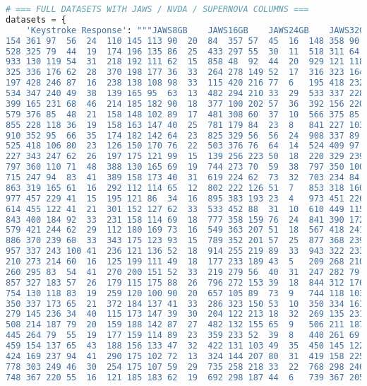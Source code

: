\begin{lstlisting}[language=Python]
# === FULL DATASETS WITH JAWS / NVDA / SUPERNOVA COLUMNS ===
datasets = {
    'Keystroke Response': """JAWS8GB	JAWS16GB	JAWS24GB	JAWS32GB	JAWS64GB	NVDA8GB	NVDA16GB	NVDA24GB	NVDA32GB	NVDA64GB	SUPERNOVA8GB	SUPERNOVA16GB	SUPERNOVA24GB	SUPERNOVA32GB	SUPERNOVA64GB	NARRATOR8GB	NARRATOR16GB	NARRATOR24GB	NARRATOR32GB	NARRATOR64GB
154	361	97	56	24	110	145	113	90	20	84	357	57	45	16	148	358	90	54	23
528	325	79	44	19	174	196	135	86	25	433	297	55	30	11	518	311	64	37	18
933	130	119	54	31	218	192	111	62	15	858	48	92	44	20	929	121	118	48	25
325	336	176	62	28	370	198	177	36	33	264	278	149	52	17	316	323	164	54	20
197	428	246	87	16	238	138	108	98	33	115	420	216	77	6	195	418	232	75	6
534	347	240	49	38	139	165	95	63	13	482	294	210	33	29	533	337	228	47	24
399	165	231	68	46	214	185	182	90	18	377	100	202	57	36	392	156	220	61	35
579	376	85	48	21	158	148	102	89	17	481	308	60	37	10	566	375	85	36	8
855	228	118	36	19	158	163	147	40	25	781	179	84	23	8	841	227	103	23	4
910	352	95	66	35	174	182	142	64	23	825	329	56	56	24	908	337	89	59	29
525	418	106	80	23	126	150	170	76	22	503	376	76	64	14	524	409	97	75	17
227	343	247	62	26	197	175	121	99	15	139	256	223	50	18	220	329	239	53	17
797	360	110	71	48	388	130	165	69	19	744	273	70	59	38	797	350	100	66	42
715	247	94	83	41	389	158	173	40	31	619	224	62	73	32	703	234	84	82	35
863	319	165	61	16	292	112	114	65	12	802	222	126	51	7	853	318	160	52	8
977	457	229	41	15	195	121	86	34	16	895	383	193	23	4	973	451	226	38	12
614	455	122	41	21	301	152	127	62	33	533	452	88	31	10	610	449	115	39	6
843	400	184	92	33	231	158	114	69	18	777	358	159	76	24	841	390	172	91	22
579	421	244	62	29	112	180	169	73	16	549	363	207	51	18	567	418	241	49	21
886	370	239	68	33	343	175	123	93	15	789	352	201	57	25	877	368	239	63	32
957	337	243	100	41	236	121	136	52	18	914	255	219	89	33	943	322	233	85	29
210	273	214	60	16	125	199	111	49	18	177	233	189	43	5	209	268	210	57	9
260	295	83	54	41	270	200	151	52	33	219	279	56	40	31	247	282	79	44	33
857	327	183	57	26	179	115	175	88	26	796	272	153	39	18	844	312	176	57	11
754	130	118	83	19	259	120	100	90	20	657	105	89	73	9	744	118	103	69	6
350	337	173	65	21	372	184	137	41	33	286	323	150	53	10	350	334	161	53	17
279	145	236	34	40	115	173	147	39	30	204	122	213	18	32	269	135	231	22	33
508	214	187	79	20	159	188	142	87	27	482	132	155	65	9	506	211	187	74	5
445	264	79	55	19	177	159	114	89	23	359	233	52	39	8	440	261	69	46	13
459	154	137	65	43	188	156	133	47	32	422	131	103	49	35	450	145	122	51	40
424	169	237	94	41	290	175	102	72	13	324	144	207	80	31	419	158	225	89	35
778	303	249	46	30	254	175	107	59	29	735	258	218	33	22	768	298	246	39	18
748	367	220	55	16	121	185	183	62	19	692	298	187	44	6	739	367	205	40	16

\end{lstlisting}
